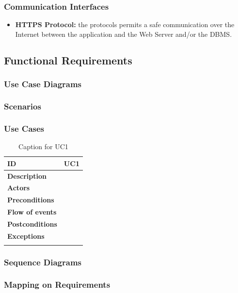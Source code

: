 \documentclass {article}
\begin{document}
	\subsubsection{Communication Interfaces}
	\begin{itemize}
		\item {\bf HTTPS Protocol:} the protocols permits a safe communication over the Internet between the application and the Web Server and/or the DBMS.
	\end{itemize}
	\subsection{Functional Requirements}
	\subsubsection{Use Case Diagrams}
	\subsubsection{Scenarios}
	\subsubsection{Use Cases}
	
	\begin{longtable}{| p{3 cm} | p{8.5 cm} |} 
			\hline
			{\bf ID} & UC1 \\
			\hline
			{\bf Description} & \\
			\hline
			{\bf Actors} & \\
			\hline
			{\bf Preconditions} & 	\\
			\hline
			{\bf Flow of events} &	\\
			\hline
			{\bf Postconditions} & \\
			\hline
			{\bf Exceptions} & 	\\
			\hline
			\caption{Caption for UC1}
			\end{longtable}

	\subsubsection{Sequence Diagrams}
	\subsubsection{Mapping on Requirements}
\end{document}
